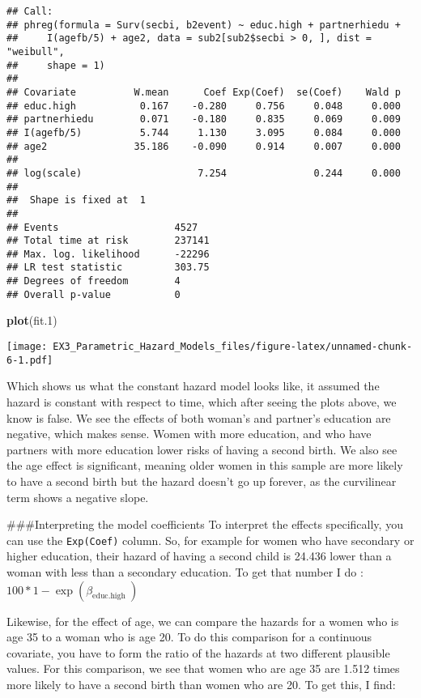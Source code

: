 \documentclass[
]{article}
\newenvironment{Shaded}{\begin{snugshade}}{\end{snugshade}}
\newcommand{\FloatTok}[1]{\textcolor[rgb]{0.00,0.00,0.81}{#1}}
\newcommand{\KeywordTok}[1]{\textcolor[rgb]{0.13,0.29,0.53}{\textbf{#1}}}
\newcommand{\NormalTok}[1]{#1}
\begin{document}
\begin{verbatim}
## Call:
## phreg(formula = Surv(secbi, b2event) ~ educ.high + partnerhiedu + 
##     I(agefb/5) + age2, data = sub2[sub2$secbi > 0, ], dist = "weibull", 
##     shape = 1)
## 
## Covariate          W.mean      Coef Exp(Coef)  se(Coef)    Wald p
## educ.high           0.167    -0.280     0.756     0.048     0.000 
## partnerhiedu        0.071    -0.180     0.835     0.069     0.009 
## I(agefb/5)          5.744     1.130     3.095     0.084     0.000 
## age2               35.186    -0.090     0.914     0.007     0.000 
## 
## log(scale)                    7.254               0.244     0.000 
## 
##  Shape is fixed at  1 
## 
## Events                    4527 
## Total time at risk        237141 
## Max. log. likelihood      -22296 
## LR test statistic         303.75 
## Degrees of freedom        4 
## Overall p-value           0
\end{verbatim}

\begin{Shaded}
\begin{Highlighting}[]
\KeywordTok{plot}\NormalTok{(fit}\FloatTok{.1}\NormalTok{)}
\end{Highlighting}
\end{Shaded}

\texttt{[image: EX3\_Parametric\_Hazard\_Models\_files/figure-latex/unnamed-chunk-6-1.pdf]}

Which shows us what the constant hazard model looks like, it assumed the
hazard is constant with respect to time, which after seeing the plots
above, we know is false. We see the effects of both woman's and
partner's education are negative, which makes sense. Women with more
education, and who have partners with more education lower risks of
having a second birth. We also see the age effect is significant,
meaning older women in this sample are more likely to have a second
birth but the hazard doesn't go up forever, as the curvilinear term
shows a negative slope.

\#\#\#Interpreting the model coefficients To interpret the effects
specifically, you can use the \texttt{Exp(Coef)} column. So, for example
for women who have secondary or higher education, their hazard of having
a second child is 24.436 lower than a woman with less than a secondary
education. To get that number I do :
\(100* 1 - \exp(\beta_{\text{educ.high }})\)

Likewise, for the effect of age, we can compare the hazards for a women
who is age 35 to a woman who is age 20. To do this comparison for a
continuous covariate, you have to form the ratio of the hazards at two
different plausible values. For this comparison, we see that women who
are age 35 are 1.512 times more likely to have a second birth than women
who are 20. To get this, I find:
\end{document}
